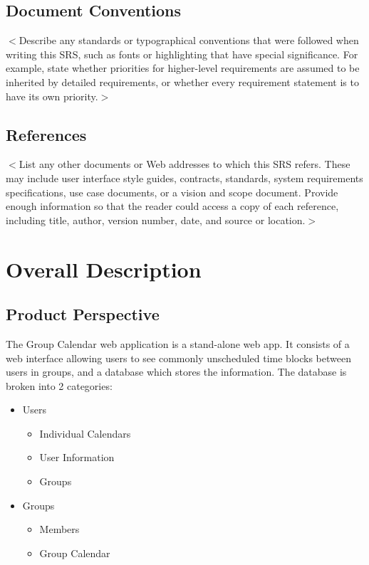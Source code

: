 \documentclass{scrreprt}
\begin{document}
\section{Document Conventions}
$<$Describe any standards or typographical conventions that were followed when
writing this SRS, such as fonts or highlighting that have special significance.
For example, state whether priorities  for higher-level requirements are assumed
to be inherited by detailed requirements, or whether every requirement statement
is to have its own priority.$>$


\section{References}
$<$List any other documents or Web addresses to which this SRS refers. These may
include user interface style guides, contracts, standards, system requirements
specifications, use case documents, or a vision and scope document. Provide
enough information so that the reader could access a copy of each reference,
including title, author, version number, date, and source or location.$>$


\chapter{Overall Description}

\section{Product Perspective}
The Group Calendar web application is a stand-alone web app. It consists of a
web interface allowing users to see commonly unscheduled time blocks between
users in groups, and a database which stores the information. The database is
broken into 2 categories:
\begin{itemize}
\item Users
	\begin{itemize}
	\item Individual Calendars
	\item User Information
	\item Groups
	\end{itemize}
\item Groups
	\begin{itemize}
	\item Members
	\item Group Calendar
	\end{itemize}
\end{itemize}
\end{document}
